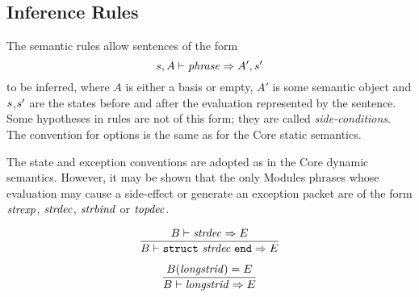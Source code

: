 \subsection{Inference Rules}
The semantic rules allow sentences  of the form
\[ s,A\vdash{\it phrase}\Rightarrow A',s' \]
to be inferred, where $A$ is either a basis or empty,
$A'$ is some semantic
object and $s$,$s'$ are the states before and after the evaluation
represented by the sentence.  Some hypotheses in rules are not of this form;
they are called {\sl side-conditions}.  The convention for options is
the same as for the Core static semantics.

The state and exception conventions are adopted as in the Core dynamic
semantics.  However, it may be shown that the only Modules phrases whose
evaluation
may cause a side-effect or generate an exception packet are of the form
${\it strexp}$, ${\it strdec}$, ${\it strbind}$ or ${\it topdec}$.

%
%
\begin{equation}        %
\frac{\B\ts\strdec\ra\E}
     {\B\ts\encstrexp\ra\E}\index{60.1}
\end{equation}

\begin{equation}        %
\frac{\B(\longstrid)=\E}
     {\B\ts\longstrid\ra\E}
\end{equation}

\insertion{\theconstructors}{\begin{equation}        %
\frac{\B\ts\strexp\ra\E\qquad\Inter\B\ts\sigexp\ra\I}
     {\B\ts\transpconstraint\ra\E\downarrow\I}
\end{equation}

\begin{equation}        %
\frac{\B\ts\strexp\ra\E\qquad\Inter\B\ts\sigexp\ra\I}
     {\B\ts\opaqueconstraint\ra\E\downarrow\I}
\end{equation}}


